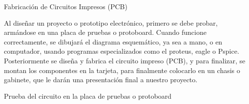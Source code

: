 \documentclass[12pt]{article}
\begin{document}
\vspace{\baselineskip}

\vspace{\baselineskip}

\vspace{\baselineskip}

\vspace{\baselineskip}

\vspace{\baselineskip}

\vspace{\baselineskip}

\vspace{\baselineskip}

\vspace{\baselineskip}

\vspace{\baselineskip}

\vspace{\baselineskip}

\vspace{\baselineskip}

\vspace{\baselineskip}
\begin{adjustwidth}{0.0in}{0.01in}
{\fontsize{17pt}{20.4pt}\selectfont \textcolor[HTML]{21409A}{Fabricación de Circuitos Impresos (PCB)}\par}\par

\end{adjustwidth}

\begin{adjustwidth}{0.0in}{0.01in}
Al diseñar un proyecto o prototipo electrónico, primero se debe probar, armándose en una placa de pruebas o protoboard. Cuando funcione correctamente, se  dibujará el diagrama esquemático, ya sea a mano, o en computador, usando programas especializados como el proteus, eagle o Pspice.  Posteriormente se diseña y fabrica el circuito impreso (PCB), y para finalizar, se montan los componentes en la tarjeta, para finalmente colocarlo en un chasis o gabinete, que le darán una presentación final a nuestro proyecto.\par

\end{adjustwidth}

Prueba del circuito en la placa de pruebas o protoboard\par



\end{document}
